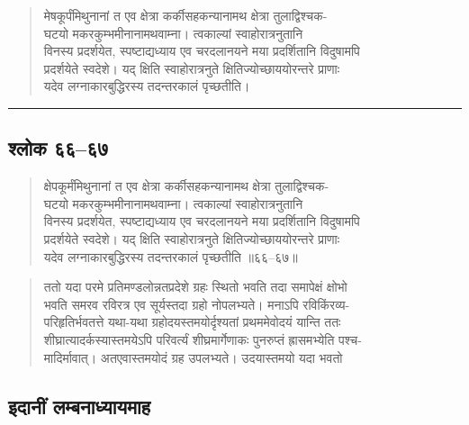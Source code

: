 \documentclass[11pt,a4paper]{article}
\newcommand{\longline}{\noindent\rule{\textwidth}{0.4pt}}
\newcommand{\dev}[1]{{\devanagarifont #1}}
\newenvironment{shloka}{%
  \begin{quote}
  \small
  \setlength{\leftmargin}{2em}
  \devanagarifont
}{\end{quote}}
\newenvironment{vyakhya}{%
  \begin{quote}
  \small
  \setlength{\leftmargin}{1em}
  \devanagarifont
}{\end{quote}}
\newcommand{\skt}[1]{{\devanagarifont #1}}
\begin{document}
\begin{vyakhya}
\skt{मेषकूर्पंमिथुनानां त एव क्षेत्रा कर्कीसहकन्यानामथ क्षेत्रा तुलाद्विश्चक-}\\
\skt{घटयो मकरकुम्भमीनानामथवाम्ना। त्वकाल्यां स्वाहोरात्रनुतानि}\\
\skt{विनस्य प्रदर्शयेत, स्पष्टाद्यध्याय एव चरदलानयने मया प्रदर्शितानि विदुषामपि}\\
\skt{प्रदर्शयेते स्वदेशे। यद् क्षिति स्वाहोरात्रनुते क्षितिज्योच्छाययोरन्तरे प्राणाः}\\
\skt{यदेव लग्नाकारबुद्धिरस्य तदन्तरकालं पृच्छतीति।}
\end{vyakhya}

\longline

\subsection{\dev{श्लोक ६६--६७}}

\begin{shloka}
\skt{क्षेपकूर्मंमिथुनानां त एव क्षेत्रा कर्कीसहकन्यानामथ क्षेत्रा तुलाद्विश्चक-}\\
\skt{घटयो मकरकुम्भमीनानामथवाम्ना। त्वकाल्यां स्वाहोरात्रनुतानि}\\
\skt{विनस्य प्रदर्शयेत, स्पष्टाद्यध्याय एव चरदलानयने मया प्रदर्शितानि विदुषामपि}\\
\skt{प्रदर्शयेते स्वदेशे। यद् क्षिति स्वाहोरात्रनुते क्षितिज्योच्छाययोरन्तरे प्राणाः}\\
\skt{यदेव लग्नाकारबुद्धिरस्य तदन्तरकालं पृच्छतीति ॥६६--६७॥}
\end{shloka}

\begin{vyakhya}
\skt{ततो यदा परमे प्रतिमण्डलोन्नतप्रदेशे ग्रहः स्थितो भवति तदा समापेक्षं क्षोभो}\\
\skt{भवति समरव रविरत्र एव सूर्यस्तदा ग्रहो नोपलभ्यते। मनाऽपि रविकिंरव्य-}\\
\skt{परिहृतिर्भवतत्ते यथा-यथा ग्रहोदयस्तमयोर्दृश्यतां प्रथममेवोदयं यान्ति ततः}\\
\skt{शीघ्रात्यादर्कस्यास्तमयेऽपि परिवर्त्यं शीघ्रमार्गेणाकः पुनरुप्तं ह्रासमभ्येति पश्च-}\\
\skt{मादिर्मावात्। अतएवास्तमयोदं ग्रह उपलभ्यते। उदयास्तमयो यदा भवतो}
\end{vyakhya}



\subsection{\dev{इदानीं लम्बनाध्यायमाह}}
\end{document}
